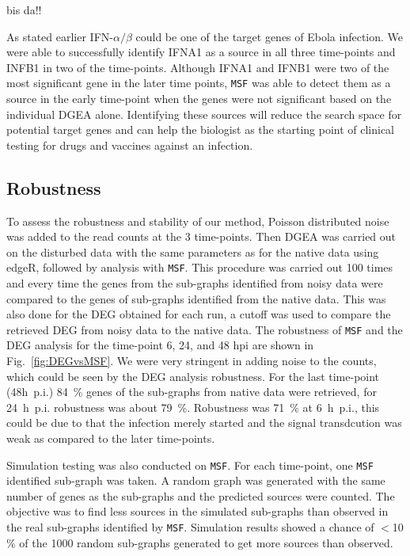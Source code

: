 \documentclass[10pt,a4paper,twocolumn]{article}
\newcommand{\TODO}[1]{\begingroup\color{red}#1\endgroup}
\begin{document}
\TODO{bis da!!}

As stated earlier IFN-$\alpha / \beta$ could be one of the target
genes of Ebola infection. We were able to successfully identify IFNA1
as a source in all three time-points and INFB1 in two of the
time-points. Although IFNA1 and IFNB1 were two of the most significant
gene in the later time points, \texttt{MSF} was able to detect them as
a source in the early time-point when the genes were not significant
based on the individual DGEA alone. Identifying these sources will
reduce the search space for potential target genes and can help the
biologist as the starting point of clinical testing for drugs and
vaccines against an infection.

\subsection*{Robustness}

To assess the robustness and stability of our method, Poisson
distributed noise was added to the read counts at the 3 time-points. Then DGEA was
carried out on the disturbed data with the same parameters as for the
native data using edgeR, followed by analysis with \texttt{MSF}. This procedure was carried out 100 times
and every time the genes from the sub-graphs identified from noisy
data were compared to the genes of sub-graphs identified from the
native data. This was also done for the DEG obtained for each run, a
cutoff was used to compare the retrieved DEG from noisy data to the
native data.  The robustness of \texttt{MSF} and the DEG analysis for
the time-point 6, 24, and 48 hpi are shown in Fig.~\ref{fig:DEGvsMSF}. We were very stringent in
adding noise to the counts, which could be seen by the DEG analysis
robustness. For the last time-point (48h~p.i.) 84~\% genes of the
sub-graphs from native data were retrieved, for 24~h~p.i. robustness was
about 79~\%. Robustness was 71~\% at 6~h~p.i., this could be due to that the
infection merely started and the signal transdcution was weak as
compared to the later time-points.

Simulation testing was also conducted on \texttt{MSF}. For each time-point, one \texttt{MSF} identified sub-graph was taken. A random graph was generated with the same number of genes as the sub-graphs and the predicted sources were counted. The objective
was to find less sources in the simulated sub-graphs than observed in the real sub-graphs identified by
\texttt{MSF}. Simulation results showed a chance of $<$10$\%$
of the 1000 random sub-graphs generated to get more sources than observed.
\end{document}
